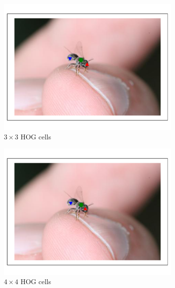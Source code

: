 \documentclass[11pt, oneside]{report}
\begin{document}
        \begin{figure}[p]
            \centering
            \begin{subfigure}[b]{0.3\textwidth}
                \centering
                \includegraphics[width=\textwidth]{hog3_2.pdf}
                \caption{$3\times3$ HOG cells}
            \end{subfigure}
            \begin{subfigure}[b]{0.3\textwidth}
                \centering
                \includegraphics[width=\textwidth]{hog4_2.pdf}
                \caption{$4\times4$ HOG cells}
            \end{subfigure}
            \begin{subfigure}[b]{0.3\textwidth}

\end{subfigure}
\end{figure}
\end{document}
